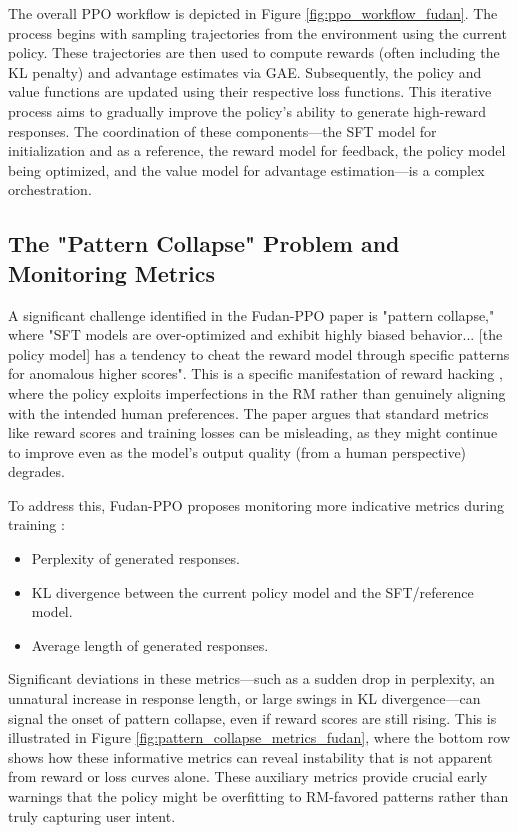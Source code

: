 \documentclass{article} %
\begin{document}
The overall PPO workflow is depicted in Figure \ref{fig:ppo_workflow_fudan}. The process begins with sampling trajectories from the environment using the current policy. These trajectories are then used to compute rewards (often including the KL penalty) and advantage estimates via GAE. Subsequently, the policy and value functions are updated using their respective loss functions. This iterative process aims to gradually improve the policy's ability to generate high-reward responses. The coordination of these components—the SFT model for initialization and as a reference, the reward model for feedback, the policy model being optimized, and the value model for advantage estimation—is a complex orchestration.


\subsection{The "Pattern Collapse" Problem and Monitoring Metrics}
A significant challenge identified in the Fudan-PPO paper is "pattern collapse," where "SFT models are over-optimized and exhibit highly biased behavior... [the policy model] has a tendency to cheat the reward model through specific patterns for anomalous higher scores". \cite{Zheng2023PPO} This is a specific manifestation of reward hacking \cite{Zhang2024EnergyLoss, Fu2024RewardShaping}, where the policy exploits imperfections in the RM rather than genuinely aligning with the intended human preferences. The paper argues that standard metrics like reward scores and training losses can be misleading, as they might continue to improve even as the model's output quality (from a human perspective) degrades. \cite{Zheng2023PPO}

To address this, Fudan-PPO proposes monitoring more indicative metrics during training \cite{Zheng2023PPO}:
\begin{itemize}
    \item Perplexity of generated responses.
    \item KL divergence between the current policy model and the SFT/reference model.
    \item Average length of generated responses.
\end{itemize}
Significant deviations in these metrics—such as a sudden drop in perplexity, an unnatural increase in response length, or large swings in KL divergence—can signal the onset of pattern collapse, even if reward scores are still rising. This is illustrated in Figure \ref{fig:pattern_collapse_metrics_fudan}, where the bottom row shows how these informative metrics can reveal instability that is not apparent from reward or loss curves alone. These auxiliary metrics provide crucial early warnings that the policy might be overfitting to RM-favored patterns rather than truly capturing user intent.
\end{document}
